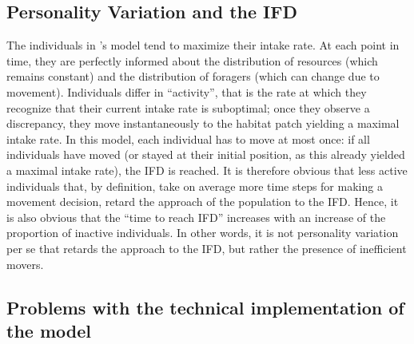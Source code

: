\begin{interludeenv}
	\subsection*{Personality Variation and the IFD}
	
	The individuals in \citeauthor{dinuzzo2020}'s model tend to maximize their intake rate.
	At each point in time, they are perfectly informed about the distribution of resources (which remains constant) and the distribution of foragers (which can change due to movement).
	Individuals differ in ``activity'', that is the rate at which they recognize that their current intake rate is suboptimal; once they observe a discrepancy, they move instantaneously to the habitat patch yielding a maximal intake rate.
	In this model, each individual has to move at most once: if all individuals have moved (or stayed at their initial position, as this already yielded a maximal intake rate), the IFD is reached.
	It is therefore obvious that less active individuals that, by definition, take on average more time steps for making a movement decision, retard the approach of the population to the IFD.
	Hence, it is also obvious that the ``time to reach IFD'' increases with an increase of the proportion of inactive individuals.
	In other words, it is not personality variation per se that retards the approach to the IFD, but rather the presence of inefficient movers.

	\subsection*{Problems with the technical implementation of the model}


\end{interludeenv}
